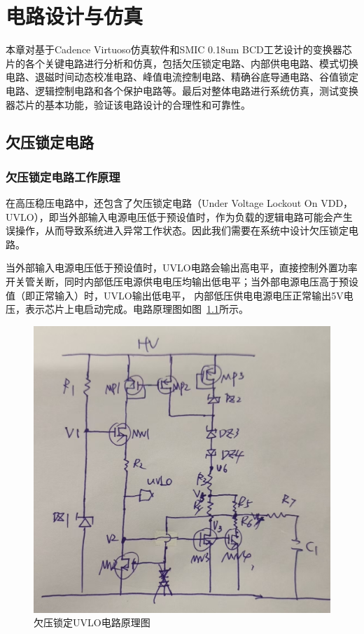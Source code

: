 \chapter{电路设计与仿真}

本章对基于Cadence Virtuoso仿真软件和SMIC 0.18um BCD工艺设计的变换器芯片的各个关键电路进行分析和仿真，包括欠压锁定电路、内部供电电路、模式切换电路、退磁时间动态校准电路、峰值电流控制电路、精确谷底导通电路、谷值锁定电路、逻辑控制电路和各个保护电路等。最后对整体电路进行系统仿真，测试变换器芯片的基本功能，验证该电路设计的合理性和可靠性。

\section{欠压锁定电路}

\subsection{欠压锁定电路工作原理}

在高压稳压电路中，还包含了欠压锁定电路（Under Voltage Lockout On VDD， UVLO），即当外部输入电源电压低于预设值时，作为负载的逻辑电路可能会产生误操作，从而导致系统进入异常工作状态。因此我们需要在系统中设计欠压锁定电路。

当外部输入电源电压低于预设值时，UVLO电路会输出高电平，直接控制外置功率开关管关断，同时内部低压电源供电电压均输出低电平；当外部电源电压高于预设值（即正常输入）时，UVLO输出低电平， 内部低压供电电源电压正常输出5V电压，表示芯片上电启动完成。电路原理图如图~\ref{fig:UVLO电路}所示。

\begin{figure}[htbp] 
    \centering
    \includegraphics[width=0.6\linewidth]{figures/UVLO电路.jpg}
    \caption{欠压锁定UVLO电路原理图}
    \label{fig:UVLO电路}
\end{figure}

